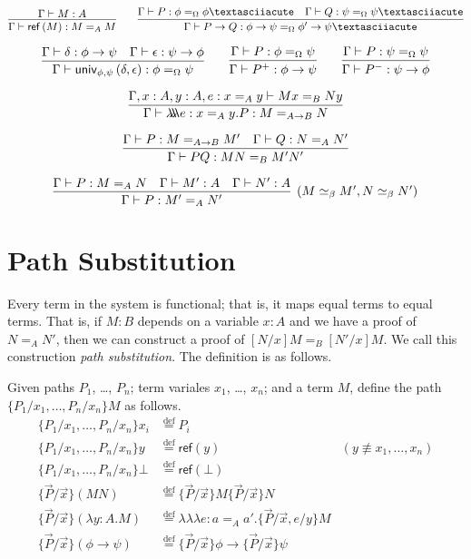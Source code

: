 \documentclass{easychair}
\newcommand{\univ}[4]{\mathsf{univ}_{{#1},{#2}} \left( {#3} , {#4} \right)}
\newcommand{\triplelambda}{\lambda \!\! \lambda \!\! \lambda}
\newcommand{\reff}[1]{\mathsf{ref} \left( {#1} \right)}
\newcommand{\eqdef}{\stackrel{\mathrm{def}}{=}}
\begin{document}
\[ \infer{\Gamma \vdash \reff{M} : M =_A M}{\Gamma \vdash M : A}
\qquad
\infer{\Gamma \vdash P \rightarrow Q : \phi \rightarrow \psi =_\Omega \phi' \rightarrow \psi´}{\Gamma \vdash P : \phi =_\Omega \phi´ \quad \Gamma \vdash Q : \psi =_\Omega \psi´} \]

\[ \infer{\Gamma \vdash \univ{\phi}{\psi}{\delta}{\epsilon} : \phi =_\Omega \psi}{\Gamma \vdash \delta : \phi \rightarrow \psi \quad \Gamma \vdash \epsilon : \psi \rightarrow \phi} 
\qquad
\infer{\Gamma \vdash P^+ : \phi \rightarrow \psi}{\Gamma \vdash P : \phi =_\Omega \psi}
\qquad
\infer{\Gamma \vdash P^- : \psi \rightarrow \phi}{\Gamma \vdash P : \psi =_\Omega \psi} \]

\[ \infer{\Gamma \vdash \triplelambda e : x =_A y . P : M =_{A \rightarrow B} N}{\Gamma, x : A, y : A, e : x =_A y \vdash M x =_B N y} \]

\[ \infer{\Gamma \vdash PQ : MN =_B M' N'}{\Gamma \vdash P : M =_{A \rightarrow B} M' \quad \Gamma \vdash Q : N =_A N'} \]

\[ \infer[(M \simeq_\beta M', N \simeq_\beta N')]{\Gamma \vdash P : M' =_A N'}{\Gamma \vdash P : M =_A N \quad \Gamma \vdash M' : A \quad \Gamma \vdash N' : A} \]

\section{Path Substitution}

Every term in the system is functional; that is, it maps equal terms to equal terms.  That is, if $M : B$ depends on a variable $x : A$ and we have a proof of $N =_A N'$,
then we can construct a proof of $[N/x]M =_B [N'/x]M$.  We call this construction \emph{path substitution}.  The definition is as follows.

Given paths $P_1$, \ldots, $P_n$; term variales $x_1$, \ldots, $x_n$; and a term $M$, define the path $\{ P_1 / x_1, \ldots, P_n / x_n \} M$ as follows.
\begin{align*}
\{ P_1 / x_1, \ldots, P_n / x_n \} x_i & \eqdef P_i \\
\{ P_1 / x_1, \ldots, P_n / x_n \} y & \eqdef \reff{y} & (y \not\equiv x_1, \ldots, x_n) \\
\{ P_1 / x_1, \ldots, P_n / x_n \} \bot & \eqdef \reff{\bot} \\
\{ \vec{P} / \vec{x} \} (MN) & \eqdef \{ \vec{P} / \vec{x} \} M \{ \vec{P} / \vec{x} \} N \\
\{ \vec{P} / \vec{x} \} (\lambda y : A . M) & \eqdef \triplelambda e : a =_A a' . \{ \vec{P} / \vec{x} , e / y \} M \\
\{ \vec{P} / \vec{x} \} (\phi \rightarrow \psi) & \eqdef \{ \vec{P} / \vec{x} \} \phi \rightarrow \{ \vec{P} / \vec{x} \} \psi
\end{align*}
\end{document}
